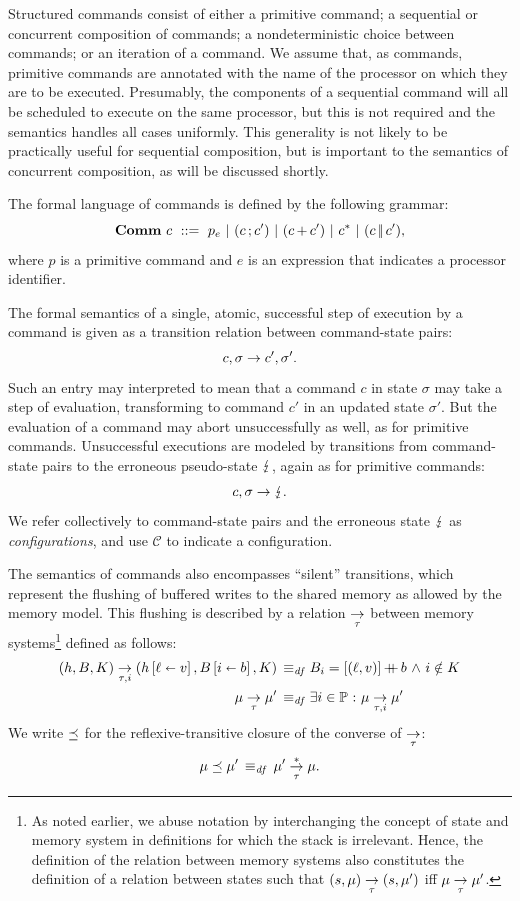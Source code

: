 \documentclass[11pt]{report}
\begin{document}
Structured commands consist of either a primitive command; a sequential or concurrent composition of commands; a nondeterministic choice between commands; or an iteration of a command. We assume that, as commands, primitive commands are annotated with the name of the processor on which they are to be executed. Presumably, the components of a sequential command will all be scheduled to execute on the same processor, but this is not required and the semantics handles all cases uniformly. This generality is not likely to be practically useful for sequential composition, but is important to the semantics of concurrent composition, as will be discussed shortly. 

The formal language of commands is defined by the following grammar: \[ \mathbf{Comm}~c ~::=~ p_e ~|~ (c \operatorname{;} c') ~|~ (c \operatorname{+} c') ~|~ c^{\operatorname{\ast}} ~|~ (c \operatorname{|\!|} c'),\] where $p$ is a primitive command and $e$ is an expression that indicates a processor identifier.  

The formal semantics of a single, atomic, successful step of execution by a command is given as a transition relation between command-state pairs: \[ c,\sigma \rightarrow c',\sigma'.\] Such an entry may interpreted to mean that a command $c$ in state $\sigma$ may take a step of evaluation, transforming to command $c'$ in an updated state $\sigma'$. But the evaluation of a command may abort unsuccessfully as well, as for primitive commands. Unsuccessful executions are modeled by transitions from command-state pairs to the erroneous pseudo-state $\lightning$, again as for primitive commands: \[ c,\sigma \rightarrow \lightning. \] We refer collectively to command-state pairs and the erroneous state $\lightning$ as \emph{configurations}, and use $\mathcal{C}$ to indicate a configuration. 

The semantics of commands also encompasses ``silent'' transitions, which represent the flushing of buffered writes to the shared memory as allowed by the memory model. This flushing is described by a relation $\underset{\tau}{\rightarrow}$ between memory systems\footnote{As noted earlier, we abuse notation by interchanging the concept of state and memory system in definitions for which the stack is irrelevant. Hence, the definition of the relation between memory systems  also constitutes the definition of a relation between states such that $(s,\mu) \underset{\tau}{\rightarrow} (s,\mu')$ iff $\mu \underset{\tau}{\rightarrow} \mu'$.} defined as follows: \begin{align*} (h,B,K) \underset{\tau,i}{\rightarrow} (h \left[ \ell \shortleftarrow v \right],B \left[ i \shortleftarrow b \right],K) \operatorname{\;\equiv_{\mathit{df}}\;} & B_i = \left[(\ell,v)\right] \operatorname{+\!\!\!+} b \operatorname{\,\wedge\,} i \notin K \\ 
\mu \underset{\tau}{\rightarrow} \mu' \operatorname{\;\equiv_{\mathit{df}}\;} & \exists i \in  \mathbb{P} \operatorname{\,:\,} \mu \underset{\tau,i}{\rightarrow} \mu'
\end{align*} We write $\preceq$ for the reflexive-transitive closure of the converse of $\underset{\tau}{\rightarrow}$: \[ \mu \preceq \mu' \operatorname{\;\equiv_{\mathit{df}}\;} \mu' \overset{\ast}{\underset{\tau}{\rightarrow}} \mu.\]
\end{document}
